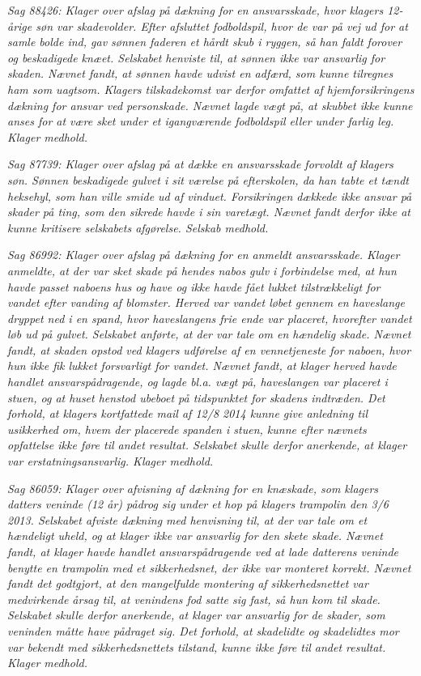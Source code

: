 \documentclass[]{book}
\begin{document}
\emph{Sag 88426: Klager over afslag på dækning for en ansvarsskade, hvor klagers 12-årige søn var skadevolder. Efter afsluttet fodboldspil, hvor de var på vej ud for at samle bolde ind, gav sønnen faderen et hårdt skub i ryggen, så han faldt forover og beskadigede knæet. Selskabet henviste til, at sønnen ikke var ansvarlig for skaden. Nævnet fandt, at sønnen havde udvist en adfærd, som kunne tilregnes ham som uagtsom. Klagers tilskadekomst var derfor omfattet af hjemforsikringens dækning for ansvar ved personskade. Nævnet lagde vægt på, at skubbet ikke kunne anses for at være sket under et igangværende fodboldspil eller under farlig leg. Klager medhold.}

\emph{Sag 87739: Klager over afslag på at dække en ansvarsskade forvoldt af klagers søn. Sønnen beskadigede gulvet i sit værelse på efterskolen, da han tabte et tændt heksehyl, som han ville smide ud af vinduet. Forsikringen dækkede ikke ansvar på skader på ting, som den sikrede havde i sin varetægt. Nævnet fandt derfor ikke at kunne kritisere selskabets afgørelse. Selskab medhold.}

\emph{Sag 86992: Klager over afslag på dækning for en anmeldt ansvarsskade. Klager anmeldte, at der var sket skade på hendes nabos gulv i forbindelse med, at hun havde passet naboens hus og have og ikke havde fået lukket tilstrækkeligt for vandet efter vanding af blomster. Herved var vandet løbet gennem en haveslange dryppet ned i en spand, hvor haveslangens frie ende var placeret, hvorefter vandet løb ud på gulvet. Selskabet anførte, at der var tale om en hændelig skade. Nævnet fandt, at skaden opstod ved klagers udførelse af en vennetjeneste for naboen, hvor hun ikke fik lukket forsvarligt for vandet. Nævnet fandt, at klager herved havde handlet ansvarspådragende, og lagde bl.a. vægt på, haveslangen var placeret i stuen, og at huset henstod ubeboet på tidspunktet for skadens indtræden. Det forhold, at klagers kortfattede mail af 12/8 2014 kunne give anledning til usikkerhed om, hvem der placerede spanden i stuen, kunne efter nævnets opfattelse ikke føre til andet resultat. Selskabet skulle derfor anerkende, at klager var erstatningsansvarlig. Klager medhold.}

\emph{Sag 86059: Klager over afvisning af dækning for en knæskade, som klagers datters veninde (12 år) pådrog sig under et hop på klagers trampolin den 3/6 2013. Selskabet afviste dækning med henvisning til, at der var tale om et hændeligt uheld, og at klager ikke var ansvarlig for den skete skade. Nævnet fandt, at klager havde handlet ansvarspådragende ved at lade datterens veninde benytte en trampolin med et sikkerhedsnet, der ikke var monteret korrekt. Nævnet fandt det godtgjort, at den mangelfulde montering af sikkerhedsnettet var medvirkende årsag til, at venindens fod satte sig fast, så hun kom til skade. Selskabet skulle derfor anerkende, at klager var ansvarlig for de skader, som veninden måtte have pådraget sig. Det forhold, at skadelidte og skadelidtes mor var bekendt med sikkerhedsnettets tilstand, kunne ikke føre til andet resultat. Klager medhold.}
\end{document}
